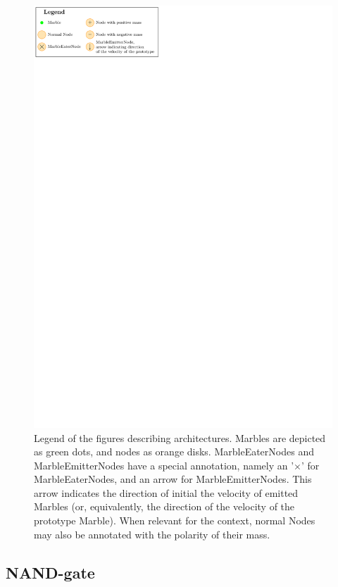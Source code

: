 \begin{figure}[h]
	\centering
	\includegraphics[scale=1.1]{figures/legend.pdf}
	\caption{Legend of the figures describing \nenwin architectures. 
		Marbles are depicted as green dots, and nodes as orange disks.
		MarbleEaterNodes and MarbleEmitterNodes have a special annotation, namely an '$\times$' for MarbleEaterNodes, 
		and an arrow for MarbleEmitterNodes. 
		This arrow indicates the direction of initial the velocity of emitted Marbles 
		(or, equivalently, the direction of the velocity of the prototype Marble).
		When relevant for the context, normal Nodes may also be annotated with the polarity of their mass.}
	\label{fig:legend}
\end{figure}

\subsection{NAND-gate}



